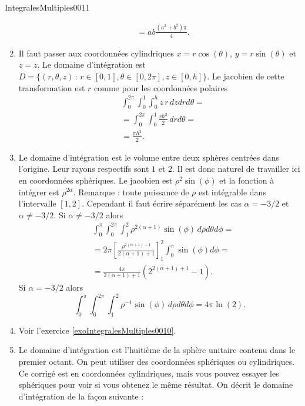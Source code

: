 \begin{corrige}{IntegralesMultiples0011}
\begin{enumerate}
\begin{equation}
\begin{aligned}
        &=ab\frac{(a^2+b^2)\pi}{4}.
      \end{aligned}
    \end{equation}
  \item  Il faut passer aux coordonnées cylindriques $x=r\cos(\theta)$, $y=r\sin(\theta)$ et $z=z$. Le domaine d'intégration est $D=\{(r,\theta, z)\,:\, r\in[0,1], \theta\in[0,2\pi], z\in[0,h]\}$. Le jacobien de cette transformation est $r$ comme pour les coordonnées polaires 
    \begin{equation}
      \begin{aligned}
        &\int_{0}^{2\pi}\int_{0}^{1} \int_{0}^{h} z \,r \,dz dr d\theta=\\
        &=\int_{0}^{2\pi}\int_0^1 \frac{rh^2}{2} \,dr d\theta=\\
        &=\frac{\pi h^2}{2}.
      \end{aligned}
    \end{equation}
  \item Le domaine d'intégration est le volume entre deux sphères centrées dans l'origine. Leur rayons respectifs sont $1$ et $2$. Il est donc naturel de travailler ici en coordonnées sphériques.  Le jacobien est $\rho^2\sin(\phi)$ et la fonction à intégrer est $\rho^{2\alpha}$. Remarque : toute puissance de $\rho$ est intégrable dans l'intervalle $[1,2]$. Cependant il faut écrire séparément les cas $\alpha=-3/2$ et $\alpha\neq -3/2$. Si $\alpha\neq -3/2$ alors
    \begin{equation}
      \begin{aligned}
        &\int_{0}^{\pi}\int_{0}^{2\pi} \int_{1}^{2} \rho^{2(\alpha+1)}\sin(\phi) \,d\rho d\theta d\phi=\\
        &=2\pi\left[\frac{\rho^{2(\alpha+1)+1}}{2(\alpha+1)+1}\right]_{1}^{2}\int_{0}^{\pi} \sin(\phi) d\phi=\\
        &=\frac{4\pi}{2(\alpha+1)+1} \left(2^{2(\alpha+1)+1}-1\right).
      \end{aligned}
    \end{equation}
    Si $\alpha=-3/2$ alors
    \begin{equation}
        \int_{0}^{\pi}\int_{0}^{2\pi} \int_{1}^{2} \rho^{-1}\sin(\phi) \,d\rho d\theta d\phi=4\pi\ln(2).
    \end{equation}
    \item Voir l'exercice \ref{exoIntegralesMultiples0010}.
    \item Le domaine d'intégration est l'huitième de la  sphère unitaire contenu dans le premier octant. On peut utiliser des coordonnées sphériques ou cylindriques. Ce corrigé est en coordonnées cylindriques, mais vous pouvez essayer les sphériques pour voir si vous obtenez le même résultat. On décrit le domaine d'intégration de la façon suivante :

\end{enumerate}
\end{corrige}

